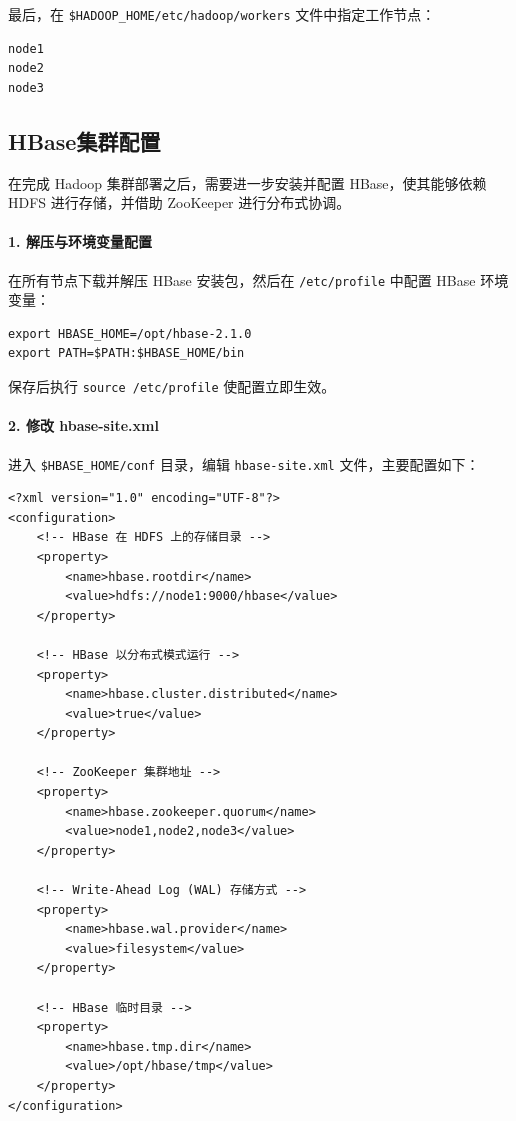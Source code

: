 \documentclass[]{bitreport}
\begin{document}
最后，在 \texttt{\$HADOOP\_HOME/etc/hadoop/workers} 文件中指定工作节点：
\begin{lstlisting}[style=shell, caption={workers配置}]
node1
node2  
node3
\end{lstlisting}

\subsection{HBase集群配置}

在完成 Hadoop 集群部署之后，需要进一步安装并配置 HBase，使其能够依赖 HDFS 进行存储，并借助 ZooKeeper 进行分布式协调。

\paragraph{1. 解压与环境变量配置}
在所有节点下载并解压 HBase 安装包，然后在 \texttt{/etc/profile} 中配置 HBase 环境变量：
\begin{lstlisting}[style=shell]
export HBASE_HOME=/opt/hbase-2.1.0
export PATH=$PATH:$HBASE_HOME/bin
\end{lstlisting}

保存后执行 \texttt{source /etc/profile} 使配置立即生效。

\paragraph{2. 修改 hbase-site.xml}
进入 \texttt{\$HBASE\_HOME/conf} 目录，编辑 \texttt{hbase-site.xml} 文件，主要配置如下：
\begin{lstlisting}[style=xml, caption={hbase-site.xml配置示例}]
<?xml version="1.0" encoding="UTF-8"?>
<configuration>
    <!-- HBase 在 HDFS 上的存储目录 -->
    <property>
        <name>hbase.rootdir</name>
        <value>hdfs://node1:9000/hbase</value>
    </property>

    <!-- HBase 以分布式模式运行 -->
    <property>
        <name>hbase.cluster.distributed</name>
        <value>true</value>
    </property>

    <!-- ZooKeeper 集群地址 -->
    <property>
        <name>hbase.zookeeper.quorum</name>
        <value>node1,node2,node3</value>
    </property>

    <!-- Write-Ahead Log (WAL) 存储方式 -->
    <property>
        <name>hbase.wal.provider</name>
        <value>filesystem</value>
    </property>

    <!-- HBase 临时目录 -->
    <property>
        <name>hbase.tmp.dir</name>
        <value>/opt/hbase/tmp</value>
    </property>
</configuration>
\end{lstlisting}
\end{document}
